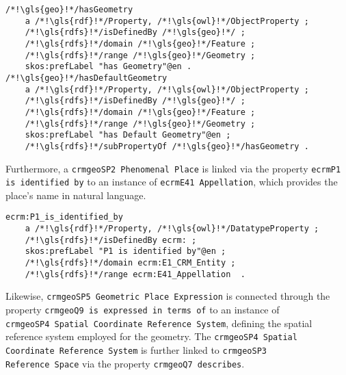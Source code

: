\begin{lstlisting}[caption=Definition of classes and property in NOnt+S, label={lst:nont-implementation-4}]
/*!\gls{geo}!*/hasGeometry
    a /*!\gls{rdf}!*/Property, /*!\gls{owl}!*/ObjectProperty ;
    /*!\gls{rdfs}!*/isDefinedBy /*!\gls{geo}!*/ ;
    /*!\gls{rdfs}!*/domain /*!\gls{geo}!*/Feature ;
    /*!\gls{rdfs}!*/range /*!\gls{geo}!*/Geometry ;
    skos:prefLabel "has Geometry"@en .
/*!\gls{geo}!*/hasDefaultGeometry
    a /*!\gls{rdf}!*/Property, /*!\gls{owl}!*/ObjectProperty ;
    /*!\gls{rdfs}!*/isDefinedBy /*!\gls{geo}!*/ ;
    /*!\gls{rdfs}!*/domain /*!\gls{geo}!*/Feature ;
    /*!\gls{rdfs}!*/range /*!\gls{geo}!*/Geometry ;
    skos:prefLabel "has Default Geometry"@en ;
    /*!\gls{rdfs}!*/subPropertyOf /*!\gls{geo}!*/hasGeometry .
\end{lstlisting}

Furthermore, a \texttt{\gls{crmgeo}SP2 Phenomenal Place} is linked via the property \texttt{\gls{ecrm}P1 is identified by} to an instance of \texttt{\gls{ecrm}E41 Appellation}, which provides the place's name in natural language. 

\begin{lstlisting}[caption=Definition of classes and property in NOnt+S, label={lst:nont-implementation-5}]
ecrm:P1_is_identified_by
    a /*!\gls{rdf}!*/Property, /*!\gls{owl}!*/DatatypeProperty ;
    /*!\gls{rdfs}!*/isDefinedBy ecrm: ;
    skos:prefLabel "P1 is identified by"@en ;
    /*!\gls{rdfs}!*/domain ecrm:E1_CRM_Entity ;
    /*!\gls{rdfs}!*/range ecrm:E41_Appellation  .
\end{lstlisting}

Likewise, \texttt{\gls{crmgeo}SP5 Geometric Place Expression} is connected through the property \texttt{\gls{crmgeo}Q9 is expressed in terms of} to an instance of\\ \texttt{\gls{crmgeo}SP4 Spatial Coordinate Reference System}, defining the spatial reference system employed for the geometry. The \texttt{\gls{crmgeo}SP4 Spatial \\Coordinate Reference System} is further linked to \texttt{\gls{crmgeo}SP3 \\Reference Space} via the property \texttt{\gls{crmgeo}Q7 describes}.

